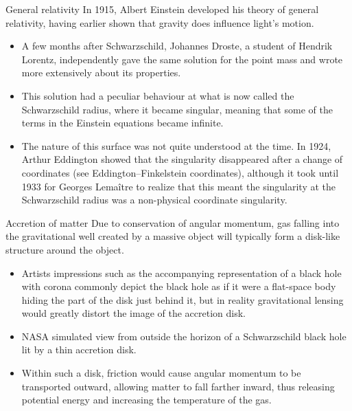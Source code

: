 \documentclass[20pt]{beamer}
\begin{document}
\begin{frame}[t]
\begin{columns}[t]
\begin{column}{0.32\linewidth}
\begin{block}{General relativity}
In 1915, Albert Einstein developed his theory of general relativity, having earlier shown that gravity does influence light's motion. 

\begin{itemize}

\item  A few months after Schwarzschild, Johannes Droste, a student of Hendrik Lorentz, independently gave the same solution for the point mass and wrote more extensively about its properties.

\item  This solution had a peculiar behaviour at what is now called the Schwarzschild radius, where it became singular, meaning that some of the terms in the Einstein equations became infinite.

\item The nature of this surface was not quite understood at the time. In 1924, Arthur Eddington showed that the singularity disappeared after a change of coordinates (see Eddington–Finkelstein coordinates), although it took until 1933 for Georges Lemaître to realize that this meant the singularity at the Schwarzschild radius was a non-physical coordinate singularity.

\end{itemize}

\end{block}


\begin{block}{Accretion of matter}
	Due to conservation of angular momentum, gas falling into the gravitational well created by a massive object will typically form a disk-like structure around the object.
\begin{itemize}
  
  \item Artists impressions such as the accompanying representation of a black hole with corona commonly depict the black hole as if it were a flat-space body hiding the part of the disk just behind it, but in reality gravitational lensing would greatly distort the image of the accretion disk.

  \item NASA simulated view from outside the horizon of a Schwarzschild black hole lit by a thin accretion disk.
	
 \item Within such a disk, friction would cause angular momentum to be transported outward, allowing matter to fall farther inward, thus releasing potential energy and increasing the temperature of the gas.


\end{itemize}
\end{block}
\end{column}
\end{columns}
\end{frame}
\end{document}
